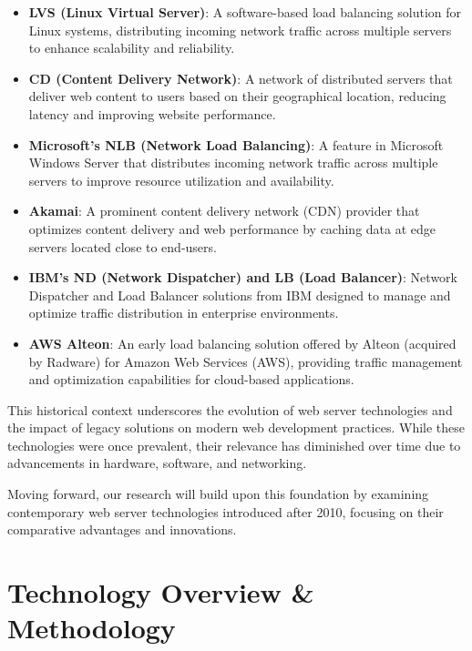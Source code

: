 \documentclass[conference]{IEEEtran}
\begin{document}
\begin{itemize}
    \item \textbf{LVS (Linux Virtual Server)}: A software-based load balancing solution for Linux systems, distributing incoming network traffic across multiple servers to enhance scalability and reliability.
    
    \item \textbf{CD (Content Delivery Network)}: A network of distributed servers that deliver web content to users based on their geographical location, reducing latency and improving website performance.
    
    \item \textbf{Microsoft's NLB (Network Load Balancing)}: A feature in Microsoft Windows Server that distributes incoming network traffic across multiple servers to improve resource utilization and availability.
    
    \item \textbf{Akamai}: A prominent content delivery network (CDN) provider that optimizes content delivery and web performance by caching data at edge servers located close to end-users.
    
    \item \textbf{IBM's ND (Network Dispatcher) and LB (Load Balancer)}: Network Dispatcher and Load Balancer solutions from IBM designed to manage and optimize traffic distribution in enterprise environments.
    
    \item \textbf{AWS Alteon}: An early load balancing solution offered by Alteon (acquired by Radware) for Amazon Web Services (AWS), providing traffic management and optimization capabilities for cloud-based applications.
\end{itemize}

This historical context underscores the evolution of web server technologies and the impact of legacy solutions on modern web development practices. While these technologies were once prevalent, their relevance has diminished over time due to advancements in hardware, software, and networking.

Moving forward, our research will build upon this foundation by examining contemporary web server technologies introduced after 2010, focusing on their comparative advantages and innovations.



\section{Technology Overview \& Methodology}
\end{document}

